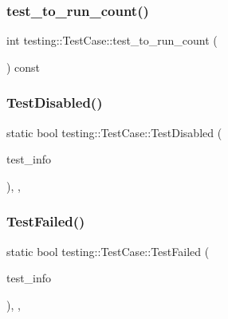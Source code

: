 \mbox{\label{classtesting_1_1_test_case_a57f115315eb756e23be6651bb5e6c638}} 
\subsubsection{\texorpdfstring{test\_to\_run\_count()}{test\_to\_run\_count()}}
{\footnotesize\ttfamily int testing\+::\+Test\+Case\+::test\+\_\+to\+\_\+run\+\_\+count (\begin{DoxyParamCaption}{ }\end{DoxyParamCaption}) const}

\mbox{\label{classtesting_1_1_test_case_a2c6989cdeac01b2153f2e34dca1dbde6}} 
\subsubsection{\texorpdfstring{TestDisabled()}{TestDisabled()}}
{\footnotesize\ttfamily static bool testing\+::\+Test\+Case\+::\+Test\+Disabled (\begin{DoxyParamCaption}\item[{const \mbox{\hyperlink{classtesting_1_1_test_info}{Test\+Info}} $\ast$}]{test\+\_\+info }\end{DoxyParamCaption})\hspace{0.3cm}{\ttfamily [inline]}, {\ttfamily [static]}, {\ttfamily [private]}}

\mbox{\label{classtesting_1_1_test_case_a5922884cb8b4819e869146dc315a1ac1}} 
\subsubsection{\texorpdfstring{TestFailed()}{TestFailed()}}
{\footnotesize\ttfamily static bool testing\+::\+Test\+Case\+::\+Test\+Failed (\begin{DoxyParamCaption}\item[{const \mbox{\hyperlink{classtesting_1_1_test_info}{Test\+Info}} $\ast$}]{test\+\_\+info }\end{DoxyParamCaption})\hspace{0.3cm}{\ttfamily [inline]}, {\ttfamily [static]}, {\ttfamily [private]}}


